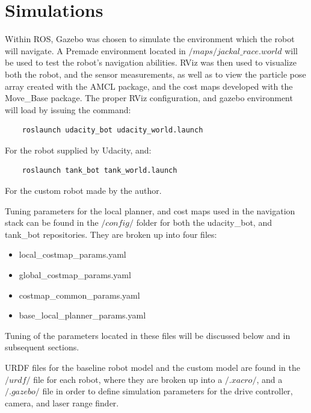 \documentclass[10pt,journal,compsoc]{IEEEtran}
\begin{document}
\section{Simulations}
Within ROS, Gazebo was chosen to simulate the environment which the robot will navigate. A Premade environment located in \textit{$/maps/jackal\_race.world$} will be used to test the robot's navigation abilities. RViz was then used to visualize both the robot, and the sensor measurements, as well as to view the particle pose array created with the AMCL package, and the cost maps developed with the Move\_Base package. The proper RViz configuration, and gazebo environment will load by issuing the command:

\begin{lstlisting}
    roslaunch udacity_bot udacity_world.launch
\end{lstlisting}

For the robot supplied by Udacity, and:

\begin{lstlisting}
    roslaunch tank_bot tank_world.launch
\end{lstlisting}

For the custom robot made by the author.


Tuning parameters for the local planner, and cost maps used in the navigation stack can be found in the \textit{$/config/$} folder for both the udacity\_bot, and tank\_bot repositories. They are broken up into four files:

\begin{itemize}

    \item local\_costmap\_params.yaml
    \item global\_costmap\_params.yaml
    \item costmap\_common\_params.yaml
    \item base\_local\_planner\_params.yaml

\end{itemize}

Tuning of the parameters located in these files will be discussed below and in subsequent sections.

URDF files for the baseline robot model and the custom model are found in the \textit{$/urdf/$} file for each robot, where they are broken up into a \textit{$/.xacro/$}, and a \textit{$/.gazebo/$} file in order to define simulation parameters for the drive controller, camera, and laser range finder.
\end{document}
